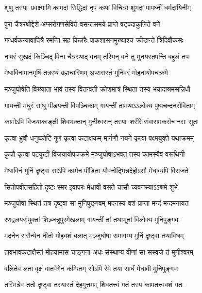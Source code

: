 \twolineshloka
{शृणु तस्याः प्रवक्ष्यामि कामदां सिद्धिदां नृप}
{कथां विचित्रां शुभदां पापघ्नीं धर्मदायिनीम्}%

\twolineshloka
{पुरा चैत्ररथोद्देशे अप्सरोगणसेविते}
{वसन्तसमये प्राप्ते षट्पदाकुलिते वने}%

\twolineshloka
{गन्धर्वकन्यावादित्रै रमन्ति सह किन्नरैः}
{पाकशासनमुख्याश्च क्रीडान्ते त्रिदिवौकसः}%

\twolineshloka
{नापरं सुखदं किञ्चिद् विना चैत्ररथाद् वनम्}
{तस्मिन् वने तु मुनयस्तपन्ति बहुलं तपः}%

\twolineshloka
{मेधाविनामानमृषिं तत्रस्थं ब्रह्मचारिणम्}
{अप्सरास्तं मुनिवरं मोहनायोपचक्रमे}%

\twolineshloka
{मञ्जुघोषेति विख्याता भावं तस्य वितन्वती}
{क्रोशमात्रं स्थिता तस्य भयादाश्रमसन्निधौ}%

\twolineshloka
{गायन्ती मधुरं साधु पीडयन्ती विपञ्चिकाम्}
{गायन्तीं तामथाऽऽलोक्य पुष्पचन्दनसेविताम्}%

\twolineshloka
{कामोऽपि विजयाकाङ्क्षी शिवभक्तान् मुनीश्वरान्}
{तस्याः शरीरे संवासमकरोन्मनसः सुतः}%

\twolineshloka
{कृत्वा भ्रुवौ धनुष्कोटिं गुणं कृत्वा कटाक्षकम्}
{मार्गणौ नयने कृत्वा पक्ष्मयुक्ते यथाक्रमम्}%

\twolineshloka
{कुचौ कृत्वा पटकुटीं विजयायोपचक्रमे}
{मञ्जुघोषाऽभवत् तस्य कामस्यैव वरूथिनी}%

\twolineshloka
{मेधाविनं मुनिं दृष्ट्वा साऽपि कामेन पीडिता}
{यौवनोद्भिन्नदेहोऽसौ मेधाव्यपि विराजते}%

\twolineshloka
{सितोपवीतसहितो दृष्टः स्मर इवापरः}
{मेधावी वसते चासौ च्यवनस्याऽऽश्रमे शुभे}%

\twolineshloka
{मञ्जुघोषा स्थितं तत्र दृष्ट्वा सा मुनिपुङ्गवम्}
{मदनस्य वशं प्राप्ता मन्दं मन्दमगायत}%

\twolineshloka
{रणद्वलयसंयुक्तां शिञ्जन्नूपुरमेखलाम्}
{गायन्तीं तां तथाभूतां विलोक्य मुनिपुङ्गवः}%

\twolineshloka
{मदनेन ससैन्येन नीतो मोहवशं बलात्}
{मञ्जुघोषा समागम्य मुनिं दृष्ट्वा तथाविधम्}%

\twolineshloka
{हावभावकटाक्षैस्तं मोहयामास चाङ्गना}
{अधः संस्थाप्य वीणां सा सस्वजे तं मुनीश्वरम्}%

\twolineshloka
{वलितेव लता वृक्षं वातवेगेन कम्पितम्}
{सोऽपि रेमे तया सार्धं मेधावी मुनिपुङ्गवः}%

\twolineshloka
{तस्मिन्नेव ततो दृष्ट्वा तस्यास्तं देहमुत्तमम्}
{शिवतत्त्वं गतं तस्य कामतत्त्ववशं गतः}%

